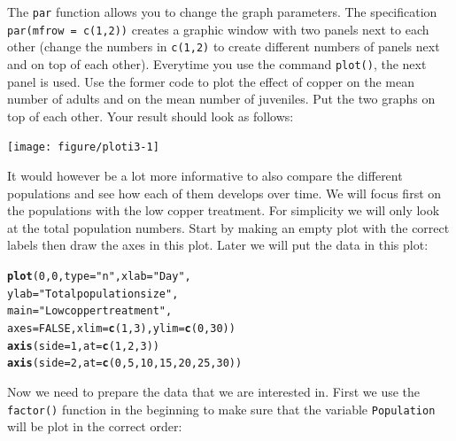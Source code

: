 \documentclass{article}\usepackage[]{graphicx}\usepackage[]{color}
\makeatletter
\newcommand{\hlnum}[1]{\textcolor[rgb]{0.686,0.059,0.569}{#1}}%
\newcommand{\hlstr}[1]{\textcolor[rgb]{0.192,0.494,0.8}{#1}}%
\newcommand{\hlstd}[1]{\textcolor[rgb]{0.345,0.345,0.345}{#1}}%
\newcommand{\hlkwc}[1]{\textcolor[rgb]{0.333,0.667,0.333}{#1}}%
\newcommand{\hlkwd}[1]{\textcolor[rgb]{0.737,0.353,0.396}{\textbf{#1}}}%
\newenvironment{kframe}{%
 \def\at@end@of@kframe{}%
 \ifinner\ifhmode%
  \def\at@end@of@kframe{\end{minipage}}%
  \begin{minipage}{\columnwidth}%
 \fi\fi%
 \def\FrameCommand##1{\hskip\@totalleftmargin \hskip-\fboxsep
 \colorbox{shadecolor}{##1}\hskip-\fboxsep
     \hskip-\linewidth \hskip-\@totalleftmargin \hskip\columnwidth}%
 \MakeFramed {\advance\hsize-\width
   \@totalleftmargin\z@ \linewidth\hsize
   \@setminipage}}%
 {\par\unskip\endMakeFramed%
 \at@end@of@kframe}
\newenvironment{knitrout}{}{} %
\makeatother
\begin{document}
The \texttt{par} function allows you to change the graph parameters. The specification \texttt{par(mfrow = c(1,2))} creates a graphic window with two panels next to each other (change the numbers in \texttt{c(1,2)} to create different numbers of panels next and on top of each other). Everytime you use the command \texttt{plot()}, the next panel is used. Use the former code to plot the effect of copper on the mean number of adults and on the mean number of juveniles. Put the two graphs on top of each other. Your result should look as follows:
\begin{knitrout}
\color{fgcolor}

{\centering \texttt{[image: figure/ploti3-1]} 

}



\end{knitrout}
It would however be a lot more informative to also compare the different populations and see how each of them develops over time. We will focus first on the populations with the low copper treatment. For simplicity we will only look at the total population numbers. Start by making an empty plot with the correct labels then draw the axes in this plot. Later we will put the data in this plot:
\begin{knitrout}
\color{fgcolor}\begin{kframe}
\begin{alltt}
\hlkwd{plot}\hlstd{(}\hlnum{0}\hlstd{,}\hlnum{0}\hlstd{,}\hlkwc{type}\hlstd{=}\hlstr{"n"}\hlstd{,}\hlkwc{xlab}\hlstd{=}\hlstr{"Day"}\hlstd{,}
     \hlkwc{ylab}\hlstd{=}\hlstr{"Total population size"}\hlstd{,}
     \hlkwc{main}\hlstd{=}\hlstr{"Low copper treatment"}\hlstd{,}
     \hlkwc{axes}\hlstd{=}\hlnum{FALSE}\hlstd{,}\hlkwc{xlim}\hlstd{=}\hlkwd{c}\hlstd{(}\hlnum{1}\hlstd{,}\hlnum{3}\hlstd{),}\hlkwc{ylim}\hlstd{=}\hlkwd{c}\hlstd{(}\hlnum{0}\hlstd{,}\hlnum{30}\hlstd{))}
\hlkwd{axis}\hlstd{(}\hlkwc{side}\hlstd{=}\hlnum{1}\hlstd{,}\hlkwc{at}\hlstd{=}\hlkwd{c}\hlstd{(}\hlnum{1}\hlstd{,}\hlnum{2}\hlstd{,}\hlnum{3}\hlstd{))}
\hlkwd{axis}\hlstd{(}\hlkwc{side}\hlstd{=}\hlnum{2}\hlstd{,} \hlkwc{at}\hlstd{=}\hlkwd{c}\hlstd{(}\hlnum{0}\hlstd{,}\hlnum{5}\hlstd{,}\hlnum{10}\hlstd{,}\hlnum{15}\hlstd{,}\hlnum{20}\hlstd{,}\hlnum{25}\hlstd{,}\hlnum{30}\hlstd{))}
\end{alltt}
\end{kframe}
\end{knitrout}
Now we need to prepare the data that we are interested in. First we use the \texttt{factor()} function in the beginning to make sure that the variable \texttt{Population} will be plot in the correct order:
\end{document}
